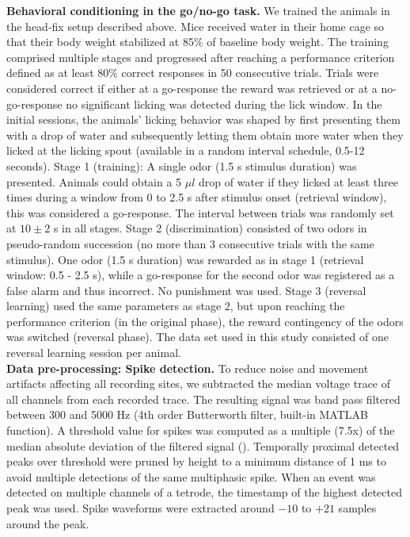 \begin{framed}
\textbf{Behavioral conditioning in the go/no-go task.} We trained the animals in the head-fix setup described above. Mice received water in their home cage so that their body weight stabilized at 85$\%$ of baseline body weight. The training comprised multiple stages and progressed after reaching a performance criterion defined as at least 80$\%$ correct responses in 50 consecutive trials. Trials were considered correct if either at a go-response the reward was retrieved or at a no-go-response no significant licking was detected during the lick window. In the initial sessions, the animals’ licking behavior was shaped by first presenting them with a drop of water and subsequently letting them obtain more water when they licked at the licking spout (available in a random interval schedule, 0.5-12 seconds). Stage 1 (training): A single odor (1.5 s stimulus duration) was presented. Animals could obtain a 5 $\mu l$ drop of water if they licked at least three times during a window from 0 to 2.5 s after stimulus onset (retrieval window), this was considered a go-response. The interval between trials was randomly set at $10\pm 2$ s in all stages. Stage 2 (discrimination) consisted of two odors in pseudo-random succession (no more than 3 consecutive trials with the same stimulus). One odor (1.5 s duration) was rewarded as in stage 1 (retrieval window: 0.5 - 2.5 s), while a go-response for the second odor was registered as a false alarm and thus incorrect. No punishment was used. Stage 3 (reversal learning) used the same parameters as stage 2, but upon reaching the performance criterion (in the original phase), the reward contingency of the odors was switched (reversal phase). The data set used in this study consisted of one reversal learning session per animal.\\
\textbf{Data pre-processing: Spike detection.} To reduce noise and movement artifacts affecting all recording sites, we subtracted the median voltage trace of all channels from each recorded trace. The resulting signal was band pass filtered between 300 and 5000 Hz (4th order Butterworth filter, built-in MATLAB function). A threshold value for spikes was computed as a multiple (7.5x) of the median absolute deviation of the filtered signal (\cite{Quiroga}). Temporally proximal detected peaks over threshold were pruned by height to a minimum distance of 1 ms to avoid multiple detections of the same multiphasic spike. When an event was detected on multiple channels of a tetrode, the timestamp of the highest detected peak was used. Spike waveforms were extracted around $-10$ to $+21$ samples around the peak.\\

\end{framed}
